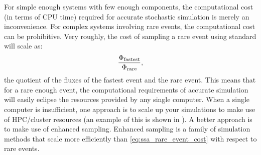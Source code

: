 For simple enough systems with few enough components, the computational cost (in terms of CPU time) required for accurate stochastic simulation is merely an inconvenience. For complex systems involving rare events, the computational cost can be prohibitive. Very roughly, the cost of sampling a rare event using standard  will scale as: 
\begin{equation}\label{eq:ssa_rare_event_cost}
    \frac{\Phi_{\textrm{fastest}}}{\Phi_{\textrm{rare}}}, 
\end{equation}
the quotient of the fluxes of the fastest event and the rare event. This means that for a rare enough event, the computational requirements of accurate simulation will easily eclipse the resources provided by any single computer. When a single computer is insufficient, one approach is to scale up your simulations to make use of HPC/cluster resources (an example of this is shown in ). A better approach is to make use of enhanced sampling. Enhanced sampling is a family of simulation methods that scale more efficiently than \eqref{eq:ssa_rare_event_cost} with respect to rare events.







